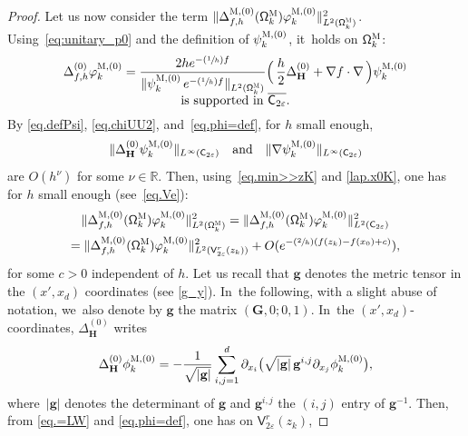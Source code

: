 \documentclass[10pt]{amsart}
\newcommand{\Psfrac}[2]{(\sfrac{#1}{#2})}
\newcommand{\quand}{\quad\text{and}\quad}
\newcommand{\mbf}[1]{\mathbf{#1}}
\let\ve\varepsilon
\theoremstyle{plain}
\theoremstyle{definition}
\begin{document}
\begin{proof}
Let us now consider the term $\Vert \Delta_{f,h}^{\textsc{M}, (0)}(\mathsf \Omega_k^{\textsc{M}})\varphi^{\textsc{M},(0)}_k \Vert_{L^2(\mathsf \Omega_k^{\textsc{M}})}^2$. Using~\eqref{eq:unitary_p0} and the definition of $\psi^{\textsc{M},(0)}_k$, it~holds on $\mathsf \Omega_k^{\textsc{M}}$:\vspace*{-3pt}
\begin{multline}
\label{eq.=LW}
\Delta_{f,h}^{(0)}\varphi^{\textsc{M},(0)}_k= \frac{2h e^{-\Psfrac 1hf} }{\Vert \psi^{\textsc{M},(0)}_k\, e^{-\Psfrac 1hf} \Vert_{L^2(\mathsf \Omega_k^{\textsc{M}})}}\Bigl(\, \frac h2 \Delta_{\mbf H}^{(0)}+\nabla f\cdot \nabla \, \Bigr)\psi^{\textsc{M},(0)}_k \\[-5pt] \text{is supported in $\overline{\mathsf C_{2\ve}}$.}
\end{multline}
By \eqref{eq.defPsi}, \eqref{eq.chiUU2}, and~\eqref{eq.phi=def}, for
$h$ small enough,\vspace*{-3pt}
\[
\Vert \Delta_{\mbf H}^{(0)}
\psi^{\textsc{M},(0)}_k\Vert_{L^\infty(\mathsf C_{2\ve})}\quand\Vert \nabla\psi^{\textsc{M},(0)}_k \Vert_{L^\infty(\mathsf C_{2\ve})}
\]
are $O(h^\nu)$ for some $\nu\in \mathbb R$.
Then, using~\eqref{eq.min>>zK} and \eqref{lap.x0K}, one has for $h$ small enough (see~\eqref{eq.Ve}):\vspace*{-3pt}
\begin{multline}
\label{eq.NeG}
\Vert \Delta_{f,h}^{\textsc{M}, (0)}(\mathsf \Omega_k^{\textsc{M}})\varphi^{\textsc{M},(0)}_k \Vert_{L^2(\mathsf \Omega_k^{\textsc{M}})}^2 =\Vert \Delta_{f,h}^{\textsc{M}, (0)}(\mathsf \Omega_k^{\textsc{M}})\varphi^{\textsc{M},(0)}_k \Vert_{L^2(\mathsf C_{2\ve})}^2\\
= \Vert \Delta_{f,h}^{\textsc{M}, (0)}(\mathsf \Omega_k^{\textsc{M}})\varphi^{\textsc{M},(0)}_k\Vert_{L^2(\mathsf V_{2\ve}^r(z_k))}^2 +O(e^{-\Psfrac 2h (f(z_k)-f(x_0)+c)}),
\end{multline}
for some $c>0$ independent of $h$. Let us recall that $\mbf g$ denotes
the metric tensor in the $(x',x_d)$ coordinates (see \eqref{g_y}). In~the following, with a slight abuse of notation, we~also denote by
$\mbf g$ the matrix $(\mbf G, 0;0, 1)$. In~the $(x',x_d)$-coordinates, $\Delta_{\mbf H}^{(0)}$ writes
\[
\Delta_{\mbf H}^{(0)} \phi^{\textsc{M},(0)}_k=-\frac{1}{\sqrt{\vert \mbf g\vert}}\sum_{i,j=1}^d \partial_{x_i}\bigl(\sqrt{\vert \mbf g\vert} \, \mbf g^{i,j} \partial_{x_j}\phi^{\textsc{M},(0)}_k \bigr),
\]
where~$\vert \mbf g\vert$ denotes the determinant of $ \mbf g$ and $\mbf g^{i,j} $ the $(i,j)$ entry of $ \mbf g^{-1}$.
Then, from \eqref{eq.=LW} and \eqref{eq.phi=def}, one has on $\mathsf V_{2\ve}^r(z_k)$,

\end{proof}
\end{document}
